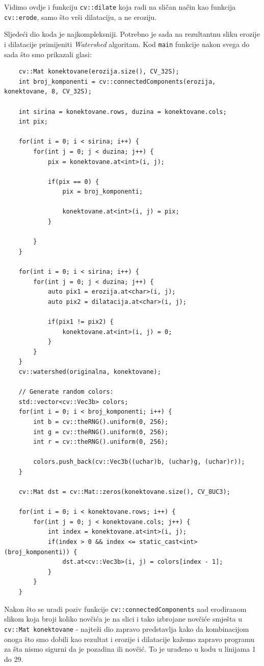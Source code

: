 \documentclass[a4paper, 12pt]{article}
\begin{document}
Vidimo ovdje i funkciju \lstinline{cv::dilate} koja radi na sličan način kao funkcija \lstinline{cv::erode}, samo što vrši dilataciju, a ne eroziju.

Sljedeći dio koda je najkompleksniji. Potrebno je sada na rezultantnu sliku erozije i dilatacije primijeniti \textit{Watershed} algoritam. Kod \lstinline{main} funkcije nakon svega do sada što smo prikazali glasi:

\begin{lstlisting}
    cv::Mat konektovane(erozija.size(), CV_32S);
    int broj_komponenti = cv::connectedComponents(erozija, konektovane, 8, CV_32S);

    int sirina = konektovane.rows, duzina = konektovane.cols;
    int pix;

    for(int i = 0; i < sirina; i++) {
        for(int j = 0; j < duzina; j++) {
            pix = konektovane.at<int>(i, j);

            if(pix == 0) {
                pix = broj_komponenti;

                konektovane.at<int>(i, j) = pix;
            }

        }
    }

    for(int i = 0; i < sirina; i++) {
        for(int j = 0; j < duzina; j++) {
            auto pix1 = erozija.at<char>(i, j);
            auto pix2 = dilatacija.at<char>(i, j);

            if(pix1 != pix2) {
                konektovane.at<int>(i, j) = 0;
            }
        }
    }
    cv::watershed(originalna, konektovane);

    // Generate random colors:
    std::vector<cv::Vec3b> colors;
    for(int i = 0; i < broj_komponenti; i++) {
        int b = cv::theRNG().uniform(0, 256);
        int g = cv::theRNG().uniform(0, 256);
        int r = cv::theRNG().uniform(0, 256);

        colors.push_back(cv::Vec3b((uchar)b, (uchar)g, (uchar)r));
    }

    cv::Mat dst = cv::Mat::zeros(konektovane.size(), CV_8UC3);

    for(int i = 0; i < konektovane.rows; i++) {
        for(int j = 0; j < konektovane.cols; j++) {
            int index = konektovane.at<int>(i, j);
            if(index > 0 && index <= static_cast<int>(broj_komponenti)) {
                dst.at<cv::Vec3b>(i, j) = colors[index - 1];
            }
        }
    }
\end{lstlisting}

Nakon što se uradi poziv funkcije \lstinline{cv::connectedComponents} nad erodiranom slikom koja broji koliko novčića je na slici i tako izbrojane novčiće smješta u \lstinline{cv::Mat konektovane} - najteži dio zapravo predstavlja kako da kombinacijom onoga što smo dobili kao rezultat i erozije i dilatacije kažemo zapravo programu za šta nismo sigurni da je pozadina ili novčić. To je urađeno u kodu u linijama 1 do 29.
\end{document}
